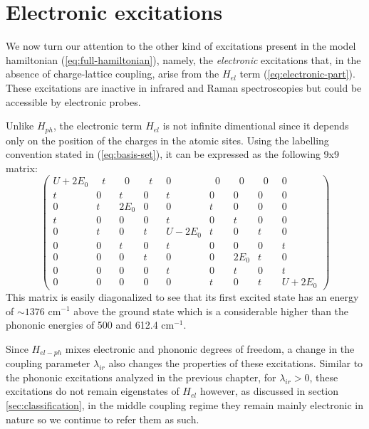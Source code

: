 \chapter{Electronic excitations}
\label{chap:electronic}

We now turn our attention to the other kind of excitations present in the model hamiltonian (\ref{eq:full-hamiltonian}), namely, the \textit{electronic} excitations that, in the absence of charge-lattice coupling, arise from the $H_{el}$ term (\ref{eq:electronic-part}).
These excitations are inactive in infrared and Raman spectroscopies but could be accessible by electronic probes.

Unlike $H_{ph}$, the electronic term $H_{el}$ is not infinite dimentional since it depends only on the position of the charges in the atomic sites. 
Using the labelling convention stated in (\ref{eq:basis-set}), it can be expressed as the following 9x9 matrix:
%
\begin{equation}\label{eq:Hel-matrix} \left( \begin{array}{ccccccccc} 
U+2E_0 &\;\;t\;\;&\;\;0\;\;&\;\;t\;\;&0&\;\;0\;\;&\;\;0\;\;&\;\;0\;\;&0 \\
t&0&t&0&t&0&0&0&0 \\
0&t&2E_0 &0&0&t&0&0&0 \\
t&0&0&0&t&0&t&0&0 \\
0&t&0&t&U-2E_0 &t&0&t&0 \\
0&0&t&0&t&0&0&0&t \\
0&0&0&t&0&0&2E_0 &t&0 \\
0&0&0&0&t&0&t&0&t \\
0&0&0&0&0&t&0&t&U+2E_0  \end{array} \right)\end{equation}
%
This matrix is easily diagonalized to see that its first excited state has an energy of $\sim 1376$ cm$^{-1}$ above the ground state which is a considerable higher than the phononic energies of 500 and 612.4 cm$^{-1}$.

Since $H_{el-ph}$ mixes electronic and phononic degrees of freedom, a change in the coupling parameter $\lambda_{ir}$ also changes the properties of these excitations.
Similar to the phononic excitations analyzed in the previous chapter, for $\lambda_{ir}>0$, these excitations do not remain eigenstates of $H_{el}$ however, as discussed in section \ref{sec:classification}, in the middle coupling regime they remain mainly electronic in nature so we continue to refer them as such.

